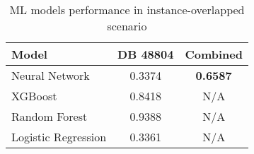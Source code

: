 \begin{table}[ht]
  \centering
  \caption{ML models performance in instance-overlapped scenario}
  \label{tab:vfl_ml_models_comparison}
  \begin{tabular}{lcc}
  \toprule
  \textbf{Model} & \textbf{DB 48804} & \textbf{Combined} \\
  \midrule
  Neural Network & 0.3374 & \textbf{0.6587} \\
  XGBoost & 0.8418 & N/A \\
  Random Forest & 0.9388 & N/A \\
  Logistic Regression & 0.3361 & N/A \\
  \bottomrule
  \end{tabular}
  \end{table}